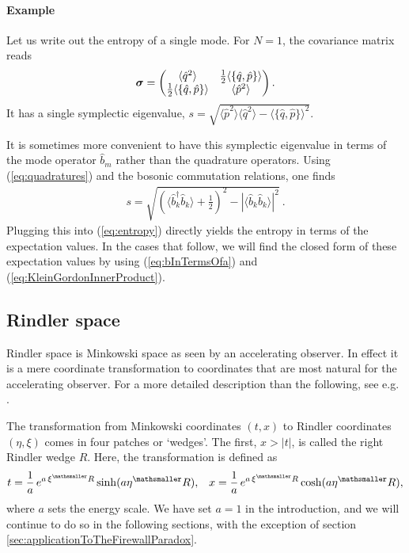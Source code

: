 \documentclass[11pt, a4paper]{article}
\newcommand{\sfrac}[2]{{\textstyle\frac{#1}{#2}}}
\newcommand{\half}{\sfrac{1}{2}}
\newcommand{\gv}[1]{\ensuremath{\mbox{\boldmath $#1$}}}
\newcommand{\nodagger}{{\phantom{\dagger}}}
\begin{document}
\paragraph{Example}
Let us write out the entropy of a single mode. For $N=1$, the covariance matrix reads
\begin{align*}
\gv \sigma =
\begin{pmatrix}
	\langle \hat q^2\rangle & \half\langle \{\hat q,\hat p\}\rangle\\
	 \half\langle \{\hat q,\hat p\}\rangle &\langle \hat  p^2\rangle\\
\end{pmatrix}.
\end{align*} 
It has a single symplectic eigenvalue, $s=\sqrt{\langle \hat p^2\rangle\langle \hat q^2\rangle-\langle \{\hat q,\hat p\}\rangle^2}$.

It is sometimes more convenient to have this symplectic eigenvalue in terms of the mode operator $\hat b_m$ rather than the quadrature operators. Using (\ref{eq:quadratures}) and the bosonic commutation relations, one finds
\begin{align}
\label{eq:symplecticEigenvalueOfOneMode}
	s=\sqrt{\left(\langle \hat b_k^\dagger \hat b^\nodagger_k \rangle + \half \right)^2-|\langle \hat b_k \hat b_k\rangle|^2}\ .
\end{align}
Plugging this into  (\ref{eq:entropy}) directly yields the entropy in terms of the expectation values. In the cases that follow, we will find the closed form of these expectation values by using (\ref{eq:bInTermsOfa}) and (\ref{eq:KleinGordonInnerProduct}).

\subsection{Rindler space}
\label{sec:RindlerSpace}

Rindler space is Minkowski space as seen by an accelerating observer. In effect it is a mere coordinate transformation to coordinates that are most natural for the accelerating observer. For a more detailed description than the following, see e.g. \cite{BirellDavies, Carroll}.

The transformation from Minkowski coordinates $(t,x)$ to Rindler coordinates $(\eta,\xi)$ comes in four patches or `wedges'. The first, $x>|t|$, is called the right Rindler wedge $R$. Here, the transformation is defined as
\begin{align*}
t=\frac{1}{a}\,e^{a\,\xi^\mathsmaller R}\sinh(a\eta^\mathsmaller R),&&x=\frac{1}{a}\,e^{a\,\xi^\mathsmaller R}\cosh(a\eta^\mathsmaller R),
\end{align*}
where $a$ sets the energy scale. We have set $a=1$ in the introduction, and we will continue to do so in the following sections,  with the exception of section \ref{sec:applicationToTheFirewallParadox}.
\end{document}
